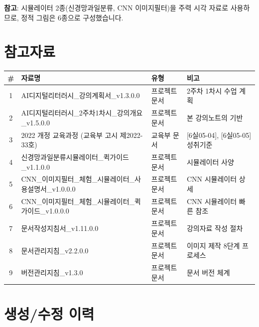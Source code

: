 \documentclass[11pt,a4paper]{article}
\begin{document}
\vspace{0.5em}
\noindent \textbf{참고}: 시뮬레이터 2종(신경망과일분류, CNN 이미지필터)을 주력 시각 자료로 사용하므로, 정적 그림은 6종으로 구성했습니다.

\section*{참고자료}

\begin{center}
\small
\begin{tabular}{|c|p{5.5cm}|p{2cm}|p{3.5cm}|}
\hline
\rowcolor{tableheader}
\textbf{\#} & \textbf{자료명} & \textbf{유형} & \textbf{비고} \\
\hline
1 & AI디지털리터러시\_강의계획서\_v1.3.0.0 & 프로젝트 문서 & 2주차 1차시 수업 계획 \\
\hline
2 & AI디지털리터러시\_2주차1차시\_강의개요\_v1.5.0.0 & 프로젝트 문서 & 본 강의노트의 기반 \\
\hline
3 & 2022 개정 교육과정 (교육부 고시 제2022-33호) & 교육부 문서 & {[6실05-04]}, {[6실05-05]} 성취기준 \\
\hline
4 & 신경망과일분류시뮬레이터\_퀵가이드\_v1.1.0.0 & 프로젝트 문서 & 시뮬레이터 사양 \\
\hline
5 & CNN\_이미지필터\_체험\_시뮬레이터\_사용설명서\_v1.0.0.0 & 프로젝트 문서 & CNN 시뮬레이터 상세 \\
\hline
6 & CNN\_이미지필터\_체험\_시뮬레이터\_퀵가이드\_v1.0.0.0 & 프로젝트 문서 & CNN 시뮬레이터 빠른 참조 \\
\hline
7 & 문서작성지침서\_v1.11.0.0 & 프로젝트 문서 & 강의자료 작성 절차 \\
\hline
8 & 문서관리지침\_v2.2.0.0 & 프로젝트 문서 & 이미지 제작 8단계 프로세스 \\
\hline
9 & 버전관리지침\_v1.3.0 & 프로젝트 문서 & 문서 버전 체계 \\
\hline
\end{tabular}
\end{center}

\section*{생성/수정 이력}
\end{document}
